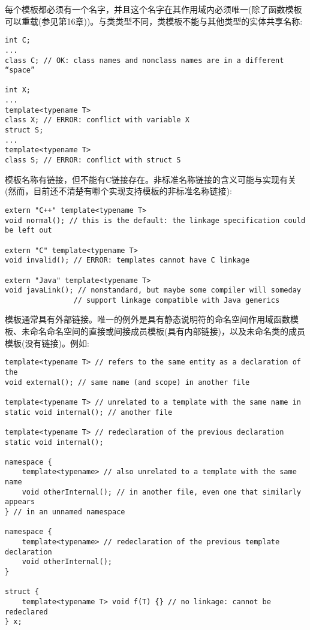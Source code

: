
每个模板都必须有一个名字，并且这个名字在其作用域内必须唯一(除了函数模板可以重载(参见第16章))。与类类型不同，类模板不能与其他类型的实体共享名称:

\begin{lstlisting}[style=styleCXX]
int C;
...
class C; // OK: class names and nonclass names are in a different “space”

int X;
...
template<typename T>
class X; // ERROR: conflict with variable X
struct S;
...
template<typename T>
class S; // ERROR: conflict with struct S
\end{lstlisting}

模板名称有链接，但不能有C链接存在。非标准名称链接的含义可能与实现有关(然而，目前还不清楚有哪个实现支持模板的非标准名称链接):

\begin{lstlisting}[style=styleCXX]
extern "C++" template<typename T>
void normal(); // this is the default: the linkage specification could be left out

extern "C" template<typename T>
void invalid(); // ERROR: templates cannot have C linkage

extern "Java" template<typename T>
void javaLink(); // nonstandard, but maybe some compiler will someday
				// support linkage compatible with Java generics
\end{lstlisting}

模板通常具有外部链接。唯一的例外是具有静态说明符的命名空间作用域函数模板、未命名命名空间的直接或间接成员模板(具有内部链接)，以及未命名类的成员模板(没有链接)。例如:

\begin{lstlisting}[style=styleCXX]
template<typename T> // refers to the same entity as a declaration of the
void external(); // same name (and scope) in another file

template<typename T> // unrelated to a template with the same name in
static void internal(); // another file

template<typename T> // redeclaration of the previous declaration
static void internal();

namespace {
	template<typename> // also unrelated to a template with the same name
	void otherInternal(); // in another file, even one that similarly appears
} // in an unnamed namespace

namespace {
	template<typename> // redeclaration of the previous template declaration
	void otherInternal();
}

struct {
	template<typename T> void f(T) {} // no linkage: cannot be redeclared
} x;
\end{lstlisting}

